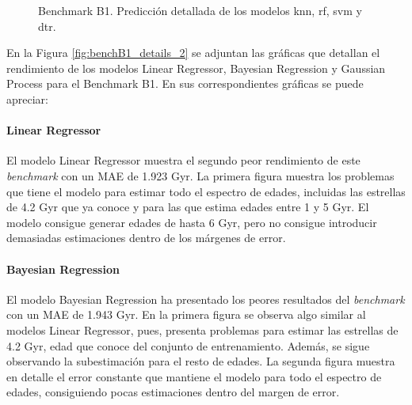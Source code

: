 \begin{figure}[h]
\begin{minipage}{.33\linewidth}
\end{minipage}%
\begin{minipage}{.33\linewidth}
\centering
{}
\end{minipage}
\caption{Benchmark B1. Predicción detallada de los modelos knn, rf, svm y dtr.}
\label{fig:benchB1_details_1}
\end{figure}

En la Figura \ref{fig:benchB1_details_2} se adjuntan las gráficas que detallan el rendimiento de los modelos Linear Regressor, Bayesian Regression y Gaussian Process para el Benchmark B1. En sus correspondientes gráficas se puede apreciar:

\paragraph{Linear Regressor} 
El modelo Linear Regressor muestra el segundo peor rendimiento de este \emph{benchmark} con un MAE de 1.923 Gyr. La primera figura muestra los problemas que tiene el modelo para estimar todo el espectro de edades, incluidas las estrellas de 4.2 Gyr que ya conoce y para las que estima edades entre 1 y 5 Gyr. El modelo consigue generar edades de hasta 6 Gyr, pero no consigue introducir demasiadas estimaciones dentro de los márgenes de error. %

\paragraph{Bayesian Regression} 
El modelo Bayesian Regression ha presentado los peores resultados del \emph{benchmark} con un MAE de 1.943 Gyr. En la primera figura se observa algo similar al modelos Linear Regressor, pues, presenta problemas para estimar las estrellas de 4.2 Gyr, edad que conoce del conjunto de entrenamiento. Además, se sigue observando la subestimación para el resto de edades. La segunda figura muestra en detalle el error constante que mantiene el modelo para todo el espectro de edades, consiguiendo pocas estimaciones dentro del margen de error. %

